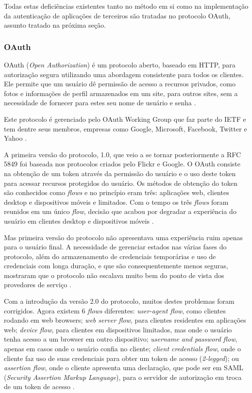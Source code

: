 \documentclass[diss]{template/setrem}
\begin{document}
Todas estas deficiências existentes tanto no método em si como na implementação da autenticação de aplicações de terceiros são tratadas no protocolo OAuth, assunto tratado na próxima seção.

\subsubsection{OAuth}
OAuth (\emph{Open Authorization}) é um protocolo aberto, baseado em HTTP, para autorização segura utilizando uma abordagem consistente para todos os clientes. Ele permite que um usuário dê permissão de acesso a recursos privados, como fotos e informações de perfil armazenados em um site, para outros sites, sem a necessidade de fornecer para estes seu nome de usuário e senha \citep{Masse2011}.

Este protocolo é gerenciado pelo OAuth Working Group que faz parte do IETF e tem dentre seus membros, empresas como Google, Microsoft, Facebook, Twitter e Yahoo \citep{Masse2011}.

A primeira versão do protocolo, 1.0, que veio a se tornar posteriormente a RFC 5849 foi baseada nos protocolos criados pelo Flickr e Google. O OAuth consiste na obtenção de um token através da permissão do usuário e o uso deste token para acessar recursos protegidos do usuário. Os métodos de obtenção do token são conhecidos como \emph{flows} e no princípio eram três: aplicações web, clientes desktop e dispositivos móveis e limitados. Com o tempo os três \emph{flows} foram reunidos em um único \emph{flow}, decisão que acabou por degradar a experiência do usuário em clientes desktop e dispositivos móveis \citep{Hammer2010}.

Mas primeira versão do protocolo não apresentava uma experiência ruim apenas para o usuário final. A necessidade de gerenciar estados nas várias fases do protocolo, além do armazenamento de credenciais temporárias e uso de credenciais com longa duração, e que são consequentemente menos seguras, mostraram que o protocolo não escalava muito bem do ponto de vista dos provedores de serviço \citep{Hammer2010}.

Com a introdução da versão 2.0 do protocolo, muitos destes problemas foram corrigidos. Agora existem 6 \emph{flows} diferentes: \emph{user-agent flow}, como clientes rodando em web browsers; \emph{web server flow}, para clientes residentes em aplicações web; \emph{device flow}, para clientes em dispositivos limitados, mas onde o usuário tenha acesso a um browser em outro dispositivo; \emph{username and password flow}, apenas em casos onde o usuário confia no cliente; \emph{client credentials flow}, onde o cliente faz uso de suas credenciais para obter um token de acesso (\emph{2-legged}); ou \emph{assertion flow}, onde o cliente apresenta uma declaração, que pode ser em SAML (\emph{Security Assertion Markup Language}), para o servidor de autorização em troca de um token de acesso \citep{Hammer2010}.
\end{document}
